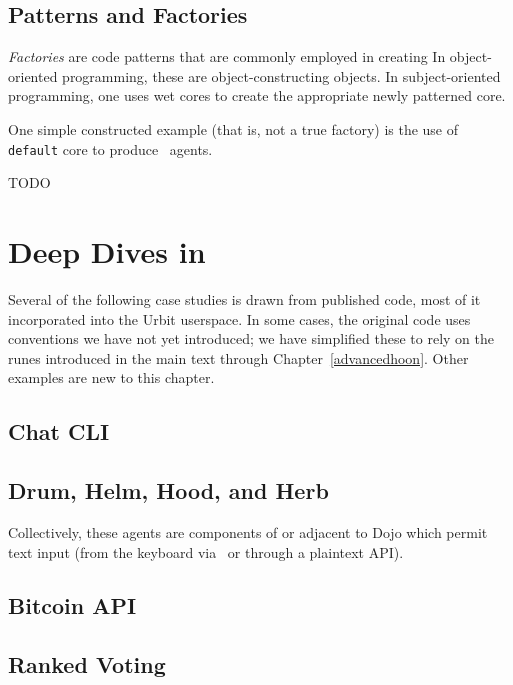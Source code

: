 \subsection{Patterns and Factories}

\emph{Factories} are code patterns that are commonly employed in creating
In object-oriented programming, these are object-constructing objects.  In subject-oriented programming, one uses wet cores to create the appropriate newly patterned core.

One simple constructed example (that is, not a true factory) is the use of \texttt{default} core to produce \gall~agents.

TODO

\section{Deep Dives in \gall}

Several of the following case studies is drawn from published code, most of it incorporated into the Urbit userspace.  In some cases, the original code uses conventions we have not yet introduced; we have simplified these to rely on the runes introduced in the main text through Chapter~\ref{advancedhoon}.  Other examples are new to this chapter.

\subsection{Chat CLI}

\subsection{Drum, Helm, Hood, and Herb}

Collectively, these agents are components of or adjacent to Dojo which permit text input (from the keyboard via \dill~or through a plaintext API).

\subsection{Bitcoin API}

\subsection{Ranked Voting}

